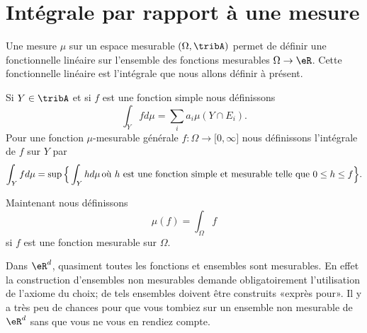 
\section{Intégrale par rapport à une mesure}

Une mesure \( \mu\) sur un espace mesurable \( (\Omega,\tribA)\) permet de définir une fonctionnelle linéaire sur l'ensemble des fonctions mesurables \( \Omega\to \eR\). Cette fonctionnelle linéaire est l'intégrale que nous allons définir à présent.

\begin{definition}  \label{DefTVOooleEst}
    Si \( Y\in \tribA\) et si \( f\) est une fonction simple nous définissons
    \begin{equation}
        \int_Yfd\mu=\sum_ia_i\mu(Y\cap E_i).
    \end{equation}
    Pour une fonction \( \mu\)-mesurable générale \( f\colon \Omega\to \mathopen[ 0 , \infty \mathclose]\) nous définissons l'intégrale de \( f\) sur \( Y\) par
    \begin{equation}        \label{EqDefintYfdmu}
        \int_Yfd\mu=\sup\Big\{ \int_Yhd\mu\,\text{où \( h\) est une fonction simple et mesurable telle que \( 0\leq h\leq f\)} \Big\}.
    \end{equation}
\end{definition}

Maintenant nous définissons
\begin{equation}
    \mu(f)=\int_{\Omega}f
\end{equation}
si \( f\) est une fonction mesurable sur \( \Omega\).

\begin{remark}
    Dans \( \eR^d\), quasiment toutes les fonctions et ensembles sont mesurables. En effet la construction d'ensembles non mesurables demande obligatoirement l'utilisation de l'axiome du choix; de tels ensembles doivent être construits «exprès pour». Il y a très peu de chances pour que vous tombiez sur un ensemble non mesurable de \( \eR^d\) sans que vous ne vous en rendiez compte.
\end{remark}

